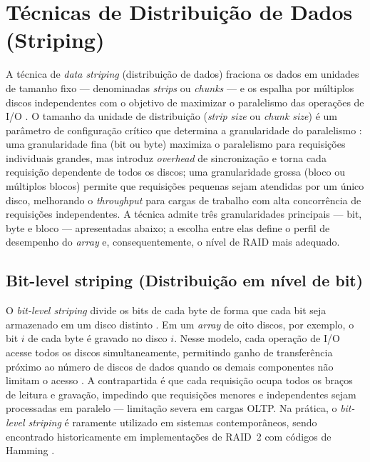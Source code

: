 \documentclass[titlepage]{article}
\begin{document}
\section{Técnicas de Distribuição de Dados (Striping)}
\label{sec:striping}
A técnica de \textit{data striping} (distribuição de dados) fraciona os dados em unidades de tamanho fixo --- denominadas \textit{strips} ou \textit{chunks} --- e os espalha por múltiplos discos independentes com o objetivo de maximizar o paralelismo das operações de I/O \cite{silberschatz2020}. O tamanho da unidade de distribuição (\textit{strip size} ou \textit{chunk size}) é um parâmetro de configuração crítico que determina a granularidade do paralelismo \cite{garciamolina2009}: uma granularidade fina (bit ou byte) maximiza o paralelismo para requisições individuais grandes, mas introduz \textit{overhead} de sincronização e torna cada requisição dependente de todos os discos; uma granularidade grossa (bloco ou múltiplos blocos) permite que requisições pequenas sejam atendidas por um único disco, melhorando o \textit{throughput} para cargas de trabalho com alta concorrência de requisições independentes. A técnica admite três granularidades principais --- bit, byte e bloco --- apresentadas abaixo; a escolha entre elas define o perfil de desempenho do \textit{array} e, consequentemente, o nível de RAID mais adequado.

\subsection{Bit-level striping (Distribuição em nível de bit)}
O \textit{bit-level striping} divide os bits de cada byte de forma que cada bit seja armazenado em um disco distinto \cite{silberschatz2020}. Em um \textit{array} de oito discos, por exemplo, o bit $i$ de cada byte é gravado no disco $i$. Nesse modelo, cada operação de I/O acesse todos os discos simultaneamente, permitindo ganho de transferência próximo ao número de discos de dados quando os demais componentes não limitam o acesso \cite{silberschatz2020}. A contrapartida é que cada requisição ocupa todos os braços de leitura e gravação, impedindo que requisições menores e independentes sejam processadas em paralelo --- limitação severa em cargas OLTP. Na prática, o \textit{bit-level striping} é raramente utilizado em sistemas contemporâneos, sendo encontrado historicamente em implementações de RAID~2 com códigos de Hamming \cite{garciamolina2009}.
\end{document}
